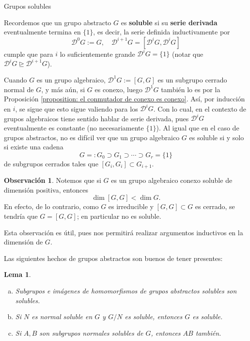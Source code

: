 \documentclass[spanish,10pt]{amsart}
\makeatletter
\renewcommand\subsection{\@startsection{subsection}{2}%
  \z@{.5\linespacing\@plus.7\linespacing}{-.5em}%
  {\normalfont\sffamily}}
\newtheorem{lemma}[theorem]{Lema}
\theoremstyle{definition}
\newtheorem{obs}[theorem]{Observación}
\theoremstyle{remark}
\numberwithin{equation}{section}
\makeatother
\begin{document}
\subsection{Grupos solubles}

Recordemos que un grupo abstracto $G$ es \textbf{soluble} si su \textbf{serie derivada} eventualmente termina en $\{1\}$, es decir, la serie definida inductivamente por
\[
    \mathcal D ^0 G :=G, \quad \mathcal D^{i + 1} G = [\mathcal D ^i G, \mathcal D^i G]
\]
cumple que para $i$ lo suficientemente grande $\mathcal D^i G = \{1\}$ (notar que $\mathcal D ^i G \unrhd \mathcal D^{i + 1} G$).

Cuando $G$ es un grupo algebraico, $\mathcal D^1 G := [G,G]$ es un subgrupo cerrado normal de $G$, y más aún, si $G$ es conexo, luego $\mathcal D^1 G$ también lo es por la Proposición \ref{proposition: el conmutador de conexo es conexo}. Así, por inducción en $i$, se sigue que esto sigue valiendo para los $\mathcal D^i G$. Con lo cual, en el contexto de grupos algebraicos tiene sentido hablar de serie derivada, pues $\mathcal D^i G$ eventualmente es constante (no necesariamente $\{1\}$). Al igual que en el caso de grupos abstractos, no es difícil ver que un grupo algebraico $G$ es soluble si y solo si existe una cadena
\[
    G =: G_0 \supset G_1 \supset \cdots \supset G_r = \{1\}
\]
de subgrupos cerrados tales que $[G_i,G_i] \subset G_{i+1}$.

\begin{obs}
Notemos que si $G$ es un grupo algebraico conexo soluble de dimensión positiva, entonces
\[
    \dim [G,G] < \dim G.
\]
En efecto, de lo contrario, como $G$ es irreducible y $[G,G] \subset G$ es cerrado, se tendría que $G = [G,G]$; en particular no es soluble.
\end{obs}
Esta observación es útil, pues nos permitirá realizar argumentos inductivos en la dimensión de $G$.

Las siguientes hechos de grupos abstractos son buenos de tener presentes:
\begin{lemma}
\begin{enumerate}[(a)]
\item Subgrupos e imágenes de homomorfismos de grupos abstractos solubles son solubles.
\item Si $N$ es normal soluble en $G$ y $G/N$ es soluble, entonces $G$ es soluble.
\item Si $A,B$ son subgrupos normales solubles de $G$, entonces $AB$ también.
\end{enumerate}
\end{lemma}
\end{document}
